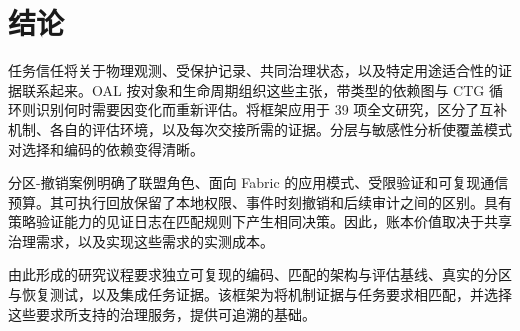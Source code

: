 \section{结论}

任务信任将关于物理观测、受保护记录、共同治理状态，以及特定用途适合性的证据联系起来。OAL 按对象和生命周期组织这些主张，带类型的依赖图与 CTG 循环则识别何时需要因变化而重新评估。将框架应用于 39 项全文研究，区分了互补机制、各自的评估环境，以及每次交接所需的证据。分层与敏感性分析使覆盖模式对选择和编码的依赖变得清晰。

分区-撤销案例明确了联盟角色、面向 Fabric 的应用模式、受限验证和可复现通信预算。其可执行回放保留了本地权限、事件时刻撤销和后续审计之间的区别。具有策略验证能力的见证日志在匹配规则下产生相同决策。因此，账本价值取决于共享治理需求，以及实现这些需求的实测成本。

由此形成的研究议程要求独立可复现的编码、匹配的架构与评估基线、真实的分区与恢复测试，以及集成任务证据。该框架为将机制证据与任务要求相匹配，并选择这些要求所支持的治理服务，提供可追溯的基础。
